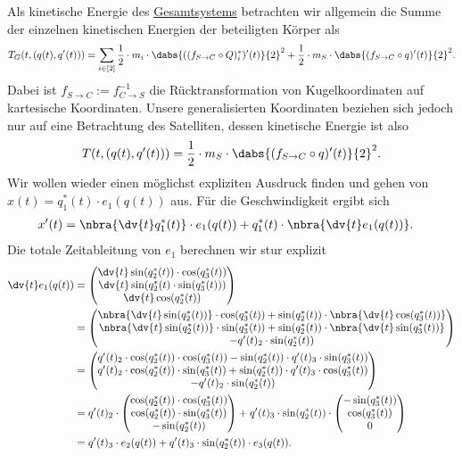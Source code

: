 \documentclass{subfiles}
\begin{document}
    Als kinetische Energie des \underline{Gesamtsystems} betrachten wir allgemein die Summe der einzelnen kinetischen Energien der beteiligten Körper als
    \[
        T_G(t,(q(t),q'(t))) = \sum_{i\in[2]}\frac12\cdot m_i\cdot\dabs{((f_{S\to C}\circ Q)_i^*)'(t)}{2}^2 + \frac12\cdot m_S\cdot\dabs{(f_{S\to C}\circ q)'(t)}{2}^2.
    \]
    Dabei ist $f_{S\to C}:= f_{C\to S}^{-1}$ die Rücktransformation von Kugelkoordinaten auf kartesische Koordinaten. Unsere generalisierten Koordinaten beziehen sich jedoch nur auf eine Betrachtung des Satelliten, dessen kinetische Energie ist also
    \[
        T(t,(q(t),q'(t))) = \frac12\cdot m_S\cdot\dabs{(f_{S\to C}\circ q)'(t)}{2}^2.
    \] 
    Wir wollen wieder einen möglichst expliziten Ausdruck finden und gehen von $x(t)=q_1^*(t)\cdot e_1(q(t))$ aus. Für die Geschwindigkeit ergibt sich 
    \begin{align*}
        x'(t) &= \nbra{\dv{t} q_1^*(t)}\cdot e_1(q(t)) + q_1^*(t)\cdot\nbra{\dv{t} e_1(q(t))}.
    \end{align*}
    Die totale Zeitableitung von $e_1$ berechnen wir stur explizit
    \begin{align*}
        \dv{t} e_1(q(t)) &= \begin{pmatrix}\dv{t} \sin(q_2^*(t))\cdot\cos(q_3^*(t))\\\dv{t} \sin(q_2^*(t)\cdot\sin(q_3^*(t)))\\\dv{t} \cos(q_2^*(t))\end{pmatrix}\\
        &= \begin{pmatrix}\nbra{\dv{t} \sin(q_2^*(t))}\cdot\cos(q_3^*(t)) + \sin(q_2^*(t))\cdot\nbra{\dv{t}\cos(q_3^*(t))}\\\nbra{\dv{t} \sin(q_2^*(t))}\cdot\sin(q_3^*(t)) + \sin(q_2^*(t))\cdot\nbra{\dv{t}\sin(q_3^*(t))}\\-q'(t)_2\cdot \sin(q_2^*(t))\end{pmatrix}\\
        &= \begin{pmatrix}q'(t)_2\cdot\cos(q_2^*(t))\cdot\cos(q_3^*(t)) - \sin(q_2^*(t))\cdot q'(t)_3\cdot\sin(q_3^*(t))\\q'(t)_2\cdot \cos(q_2^*(t))\cdot\sin(q_3^*(t)) + \sin(q_2^*(t))\cdot q'(t)_3\cdot \cos(q_3^*(t))\\-q'(t)_2\cdot \sin(q_2^*(t))\end{pmatrix}\\
        &= q'(t)_2\cdot \begin{pmatrix}\cos(q_2^*(t))\cdot\cos(q_3^*(t))\\ \cos(q_2^*(t))\cdot\sin(q_3^*(t))\\ -\sin(q_2^*(t))\end{pmatrix} 
        + q'(t)_3\cdot\sin(q_2^*(t))\cdot\begin{pmatrix}-\sin(q_3^*(t))\\ \cos(q_3^*(t))\\ 0\end{pmatrix}\\
        &= q'(t)_3\cdot e_2(q(t)) + q'(t)_3\cdot\sin(q_2^*(t))\cdot e_3(q(t)).
    \end{align*}
\end{document}
